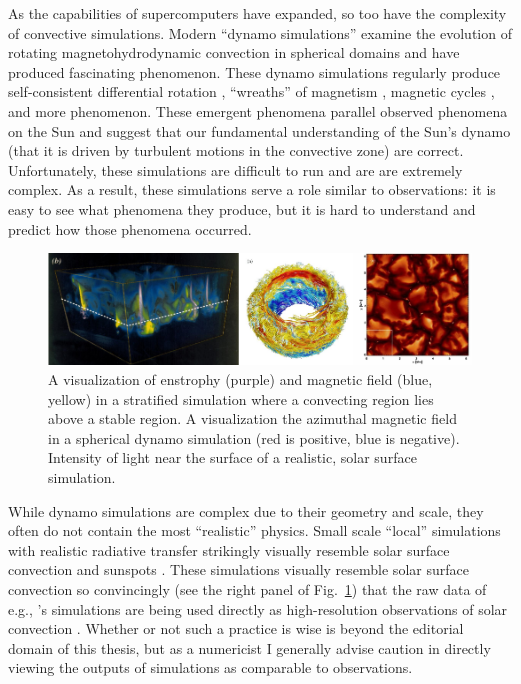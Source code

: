 As the capabilities of supercomputers have expanded, so too have the complexity of convective simulations.
Modern ``dynamo simulations'' examine the evolution of rotating magnetohydrodynamic convection in spherical domains and have produced fascinating phenomenon.
These dynamo simulations regularly produce self-consistent differential rotation \citep{strugarek&all2018}, ``wreaths'' of magnetism \citep[][and visualized in the middle panel of Fig.~\ref{fig:complex_simulations}]{brown&all2010, brown&all2011}, magnetic cycles \citep{brown&all2011}, and more phenomenon.
These emergent phenomena parallel observed phenomena on the Sun and suggest that our fundamental understanding of the Sun's dynamo (that it is driven by turbulent motions in the convective zone) are correct.
Unfortunately, these simulations are difficult to run and are are extremely complex.
As a result, these simulations serve a role similar to observations: it is easy to see what phenomena they produce, but it is hard to understand and predict how those phenomena occurred.

\begin{figure}[t!]
\vspace{0.25cm}
\includegraphics[width=\textwidth]{./figs/intro/complex_simulations.pdf}
\caption[Modification of Nu vs.~Ra in rotating RBC and magnetoconvection.]
{
	\citep[left, Fig.~2b of][]{tobias&all1998} A visualization of enstrophy (purple) and magnetic field (blue, yellow) in a stratified simulation where a convecting region lies above a stable region.
	\citep[middle, Fig.~2a of][]{brown&all2011} A visualization the azimuthal magnetic field in a spherical dynamo simulation (red is positive, blue is negative).
	\citep[right, Fig.~6a of][]{rempel2014} Intensity of light near the surface of a realistic, solar surface simulation.
	\label{fig:complex_simulations} 
}
\end{figure}


While dynamo simulations are complex due to their geometry and scale, they often do not contain the most ``realistic'' physics.
Small scale ``local'' simulations with realistic radiative transfer strikingly visually resemble solar surface convection and sunspots \citep{stein&nordlund1998, rempel&all2009, stein&nordlund2012, rempel2014}.
These simulations visually resemble solar surface convection so convincingly (see the right panel of Fig.~\ref{fig:complex_simulations}) that the raw data of e.g., \cite{rempel2014}'s simulations are being used directly as high-resolution observations of solar convection \cite[see e.g.,][and others]{vankooten&cranmer2017, shchukina&trujillo2019}.
Whether or not such a practice is wise is beyond the editorial domain of this thesis, but as a numericist I generally advise caution in directly viewing the outputs of simulations as comparable to observations.

